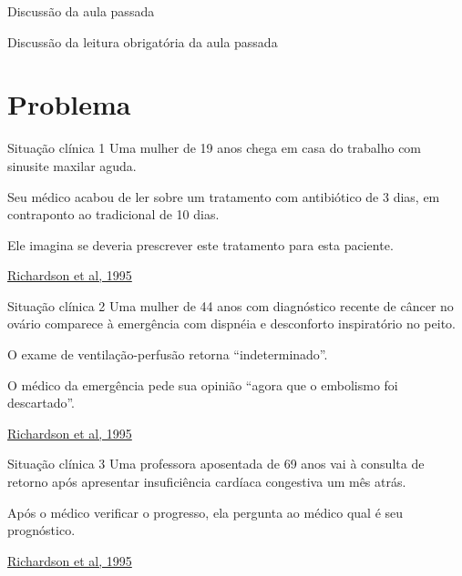 \documentclass{beamer}
\begin{document}

\begin{frame}{Discussão da aula passada}
  \begin{block}{}
    Discussão da leitura obrigatória da aula passada
  \end{block}
\end{frame}

\section{Problema}

\begin{frame}
  \begin{exampleblock}{Situação clínica 1}
    \footnotesize
    Uma mulher de 19 anos chega em casa do trabalho com sinusite maxilar aguda.

    \bigskip
    Seu médico acabou de ler sobre um tratamento com antibiótico de 3 dias, em contraponto ao tradicional de 10 dias.

    \bigskip
    Ele imagina se deveria prescrever este tratamento para esta paciente.
  \end{exampleblock}

  \vfill
  \scriptsize
  \hfill \href{https://acpjc.acponline.org/Content/123/3/issue/ACPJC-1995-123-3-A12.htm}
      {Richardson et al, 1995}
\end{frame}

\begin{frame}
  \begin{exampleblock}{Situação clínica 2}
    \footnotesize
    Uma mulher de 44 anos com diagnóstico recente de câncer no ovário comparece à emergência com dispnéia e desconforto inspiratório no peito.

    \bigskip
    O exame de ventilação-perfusão retorna ``indeterminado''.

    \bigskip
    O médico da emergência pede sua opinião ``agora que o embolismo foi descartado''.
  \end{exampleblock}

  \vfill
  \scriptsize
  \hfill \href{https://acpjc.acponline.org/Content/123/3/issue/ACPJC-1995-123-3-A12.htm}
      {Richardson et al, 1995}
\end{frame}

\begin{frame}
  \begin{exampleblock}{Situação clínica 3}
    \footnotesize
    Uma professora aposentada de 69 anos vai à consulta de retorno após apresentar insuficiência cardíaca congestiva um mês atrás.

    \bigskip
    Após o médico verificar o progresso, ela pergunta ao médico qual é seu prognóstico.
  \end{exampleblock}

  \vfill
  \scriptsize
  \hfill \href{https://acpjc.acponline.org/Content/123/3/issue/ACPJC-1995-123-3-A12.htm}
      {Richardson et al, 1995}
\end{frame}
\end{document}
